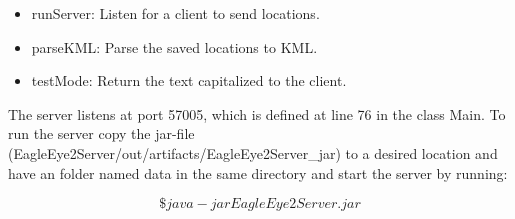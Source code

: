 \begin{itemize} \itemsep1pt \parskip0pt 
  \item runServer: Listen for a client to send locations.
  \item parseKML: Parse the saved locations to KML.
  \item testMode: Return the text capitalized to the client.
\end{itemize}

The server listens at port 57005, which is defined at line 76 in the class Main. To run the server copy the jar-file (EagleEye2Server/out/artifacts/EagleEye2Server\_jar) to a desired location and have an folder named data in the same directory and start the server by running:

\[
\$ java -jar EagleEye2Server.jar 
\]
